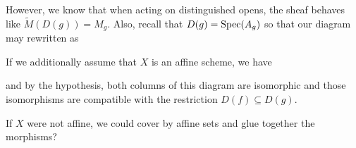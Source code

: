 \documentclass[12pt]{memoir}
\begin{document}
\begin{ptcbr}
\begin{center}
\end{center}
However, we know that when acting on distinguished opens, the sheaf behaves like $\widetilde{M}(D(g))=M_g$. Also, recall that $D(g)=\operatorname{Spec}(A_g)$ so that our diagram may rewritten as 
\begin{center}
\end{center}
If we additionally assume that $X$ is an affine scheme, we have 
\begin{center}
\end{center}
and by the hypothesis, both columns of this diagram are isomorphic and those isomorphisms are compatible with the restriction $D(f)\subseteq D(g)$.\par 
If $X$ were not affine, we could cover by affine sets and glue together the morphisms? 
\end{ptcbr}
\end{document}
